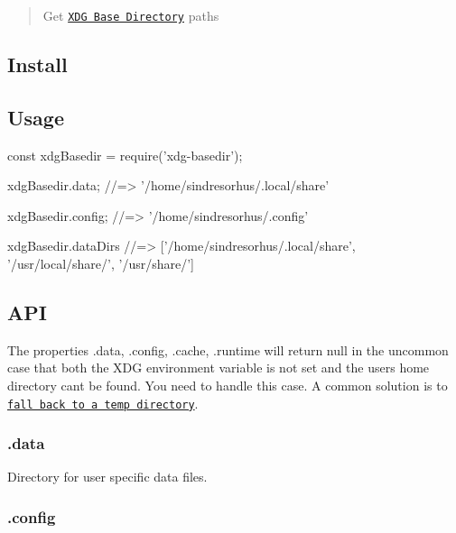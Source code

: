 \begin{quote}
Get \href{https://specifications.freedesktop.org/basedir-spec/basedir-spec-latest.html}{\tt X\+DG Base Directory} paths \end{quote}


\subsection*{Install}




\subsection*{Usage}


\begin{DoxyCode}
const xdgBasedir = require('xdg-basedir');

xdgBasedir.data;
//=> '/home/sindresorhus/.local/share'

xdgBasedir.config;
//=> '/home/sindresorhus/.config'

xdgBasedir.dataDirs
//=> ['/home/sindresorhus/.local/share', '/usr/local/share/', '/usr/share/']
\end{DoxyCode}


\subsection*{A\+PI}

The properties {\ttfamily .data}, {\ttfamily .config}, {\ttfamily .cache}, {\ttfamily .runtime} will return {\ttfamily null} in the uncommon case that both the X\+DG environment variable is not set and the users home directory can\textquotesingle{}t be found. You need to handle this case. A common solution is to \href{https://github.com/yeoman/configstore/blob/b82690fc401318ad18dcd7d151a0003a4898a314/index.js#L15}{\tt fall back to a temp directory}.

\subsubsection*{.data}

Directory for user specific data files.

\subsubsection*{.config}

